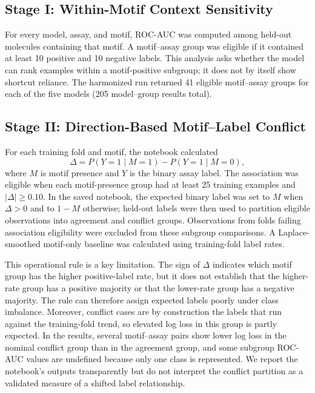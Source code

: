 \documentclass[conference]{IEEEtran}
\begin{document}
\subsection{Stage I: Within-Motif Context Sensitivity}
For every model, assay, and motif, ROC-AUC was computed among held-out molecules containing that motif. A motif--assay group was eligible if it contained at least 10 positive and 10 negative labels. This analysis asks whether the model can rank examples within a motif-positive subgroup; it does not by itself show shortcut reliance. The harmonized run returned 41 eligible motif--assay groups for each of the five models (205 model--group results total).

\subsection{Stage II: Direction-Based Motif--Label Conflict}
For each training fold and motif, the notebook calculated
\begin{equation}
\Delta=P(Y=1\mid M=1)-P(Y=1\mid M=0),
\end{equation}
where $M$ is motif presence and $Y$ is the binary assay label. The association was eligible when each motif-presence group had at least 25 training examples and $|\Delta|\geq0.10$. In the saved notebook, the expected binary label was set to $M$ when $\Delta>0$ and to $1-M$ otherwise; held-out labels were then used to partition eligible observations into agreement and conflict groups. Observations from folds failing association eligibility were excluded from these subgroup comparisons. A Laplace-smoothed motif-only baseline was calculated using training-fold label rates.

This operational rule is a key limitation. The sign of $\Delta$ indicates which motif group has the higher positive-label rate, but it does not establish that the higher-rate group has a positive majority or that the lower-rate group has a negative majority. The rule can therefore assign expected labels poorly under class imbalance. Moreover, conflict cases are by construction the labels that run against the training-fold trend, so elevated log loss in this group is partly expected. In the results, several motif--assay pairs show lower log loss in the nominal conflict group than in the agreement group, and some subgroup ROC-AUC values are undefined because only one class is represented. We report the notebook's outputs transparently but do not interpret the conflict partition as a validated measure of a shifted label relationship.
\end{document}
